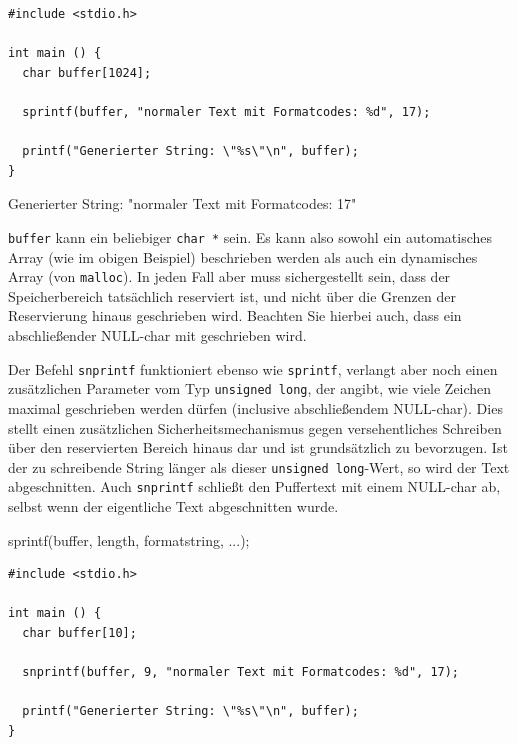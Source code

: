 \begin{codebox}
\begin{verbatim}
#include <stdio.h>

int main () {
  char buffer[1024];
  
  sprintf(buffer, "normaler Text mit Formatcodes: %d", 17);
  
  printf("Generierter String: \"%s\"\n", buffer);
}
\end{verbatim}
\end{codebox}

\begin{cmdbox}
Generierter String: "normaler Text mit Formatcodes: 17"
\end{cmdbox}

\texttt{buffer} kann ein beliebiger \texttt{char *} sein. Es kann also sowohl ein automatisches Array (wie im obigen Beispiel) beschrieben werden als auch ein dynamisches Array (von \texttt{malloc}). In jeden Fall aber muss sichergestellt sein, dass der Speicherbereich tatsächlich reserviert ist, und nicht über die Grenzen der Reservierung hinaus geschrieben wird. Beachten Sie hierbei auch, dass ein abschließender NULL-char mit geschrieben wird.

Der Befehl \texttt{snprintf} funktioniert ebenso wie \texttt{sprintf}, verlangt aber noch einen zusätzlichen Parameter vom Typ \texttt{unsigned long}, der angibt, wie viele Zeichen maximal geschrieben werden dürfen (inclusive abschließendem NULL-char). Dies stellt einen zusätzlichen Sicherheitsmechanismus gegen versehentliches Schreiben über den reservierten Bereich hinaus dar und ist grundsätzlich zu bevorzugen. Ist der zu schreibende String länger als dieser \texttt{unsigned long}-Wert, so wird der Text abgeschnitten. Auch \texttt{snprintf} schließt den Puffertext mit einem NULL-char ab, selbst wenn der eigentliche Text abgeschnitten wurde.

\begin{codebox}
sprintf(buffer, length, formatstring, ...);
\end{codebox}

\begin{codebox}
\begin{verbatim}
#include <stdio.h>

int main () {
  char buffer[10];
  
  snprintf(buffer, 9, "normaler Text mit Formatcodes: %d", 17);
  
  printf("Generierter String: \"%s\"\n", buffer);
}
\end{verbatim}
\end{codebox}

